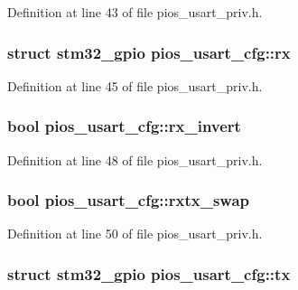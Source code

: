 \-Definition at line 43 of file pios\-\_\-usart\-\_\-priv.\-h.

\hypertarget{structpios__usart__cfg_a8d393f43a5f748de6580907c5f7d0a48}{
\subsubsection[{rx}]{\setlength{\rightskip}{0pt plus 5cm}struct {\bf stm32\-\_\-gpio} {\bf pios\-\_\-usart\-\_\-cfg\-::rx}}}\label{structpios__usart__cfg_a8d393f43a5f748de6580907c5f7d0a48}


\-Definition at line 45 of file pios\-\_\-usart\-\_\-priv.\-h.

\hypertarget{structpios__usart__cfg_a89504d674cb5ee30a137ad3d0405c8dd}{
\subsubsection[{rx\-\_\-invert}]{\setlength{\rightskip}{0pt plus 5cm}bool {\bf pios\-\_\-usart\-\_\-cfg\-::rx\-\_\-invert}}}\label{structpios__usart__cfg_a89504d674cb5ee30a137ad3d0405c8dd}


\-Definition at line 48 of file pios\-\_\-usart\-\_\-priv.\-h.

\hypertarget{structpios__usart__cfg_a19b707efa22b300cd9af50ded5e95b6d}{
\subsubsection[{rxtx\-\_\-swap}]{\setlength{\rightskip}{0pt plus 5cm}bool {\bf pios\-\_\-usart\-\_\-cfg\-::rxtx\-\_\-swap}}}\label{structpios__usart__cfg_a19b707efa22b300cd9af50ded5e95b6d}


\-Definition at line 50 of file pios\-\_\-usart\-\_\-priv.\-h.

\hypertarget{structpios__usart__cfg_adc652d014f5c2fd4c1cc152df614ba64}{
\subsubsection[{tx}]{\setlength{\rightskip}{0pt plus 5cm}struct {\bf stm32\-\_\-gpio} {\bf pios\-\_\-usart\-\_\-cfg\-::tx}}}\label{structpios__usart__cfg_adc652d014f5c2fd4c1cc152df614ba64}


